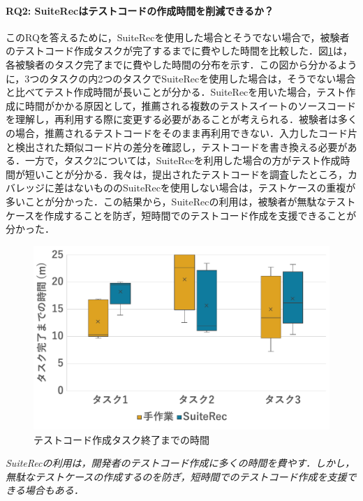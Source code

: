 \documentclass[12pt]{jarticle} %
\begin{document}
\paragraph{RQ2: {\sf SuiteRec}はテストコードの作成時間を削減できるか？}このRQを答えるために，{\sf SuiteRec}を使用した場合とそうでない場合で，被験者のテストコード作成タスクが完了するまでに費やした時間を比較した．図\ref{time}は，各被験者のタスク完了までに費やした時間の分布を示す．この図から分かるように，3つのタスクの内2つのタスクで{\sf SuiteRec}を使用した場合は，そうでない場合と比べてテスト作成時間が長いことが分かる．{\sf SuiteRec}を用いた場合，テスト作成に時間がかかる原因として，推薦される複数のテストスイートのソースコードを理解し，再利用する際に変更する必要があることが考えられる．被験者は多くの場合，推薦されるテストコードをそのまま再利用できない．入力したコード片と検出された類似コード片の差分を確認し，テストコードを書き換える必要がある．一方で，タスク2については，{\sf SuiteRec}を利用した場合の方がテスト作成時間が短いことが分かる．我々は，提出されたテストコードを調査したところ，カバレッジに差はないものの{\sf SuiteRec}を使用しない場合は，テストケースの重複が多いことが分かった．この結果から，{\sf SuiteRec}の利用は，被験者が無駄なテストケースを作成することを防ぎ，短時間でのテストコード作成を支援できることが分かった．


\begin{figure}[htbp]
\begin{center}
\includegraphics[width=12cm]{image/time.pdf}
\caption{テストコード作成タスク終了までの時間}
\label{time}
\end{center}
\end{figure}

\begin{breakbox}
\textit{{\sf SuiteRec}の利用は，開発者のテストコード作成に多くの時間を費やす．しかし，無駄なテストケースの作成するのを防ぎ，短時間でのテストコード作成を支援できる場合もある．}
\end{breakbox}
\end{document}
